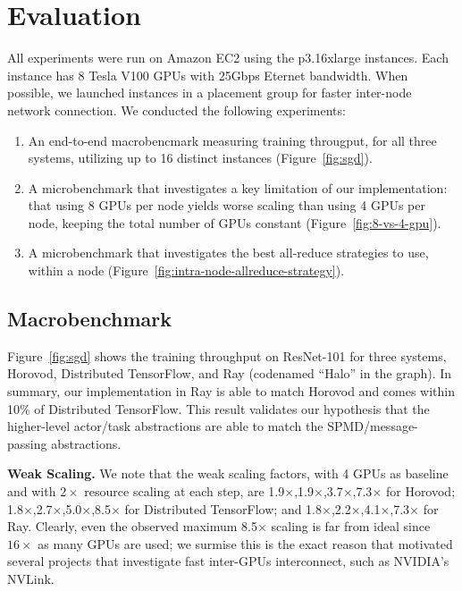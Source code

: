 
\section{Evaluation}
All experiments were run on Amazon EC2 using the p3.16xlarge instances.  Each instance has 8 Tesla V100 GPUs with 25Gbps Eternet bandwidth.  When possible, we launched instances in a placement group for faster inter-node network connection.  We conducted the following experiments:

\begin{enumerate}
    \item An end-to-end macrobencmark measuring training througput, for all three systems, utilizing up to 16 distinct instances (Figure~\ref{fig:sgd}).
    \item A microbenchmark that investigates a key limitation of our implementation: that using 8 GPUs per node yields worse scaling than using 4 GPUs per node, keeping the total number of GPUs constant (Figure~\ref{fig:8-vs-4-gpu}).
    \item A microbenchmark that investigates the best all-reduce strategies to use, within a node (Figure~\ref{fig:intra-node-allreduce-strategy}).
\end{enumerate}


\subsection{Macrobenchmark}
Figure~\ref{fig:sgd} shows the training throughput on ResNet-101 for three systems, Horovod, Distributed TensorFlow, and Ray (codenamed ``Halo'' in the graph).  In summary, our implementation in Ray is able to match Horovod and comes within 10\% of Distributed TensorFlow.  This result validates our hypothesis that the higher-level actor/task abstractions are able to match the SPMD/message-passing abstractions.

{\bf Weak Scaling.}  We note that the weak scaling factors, with 4 GPUs as baseline and with $2\times$ resource scaling at each step, are 1.9$\times$,1.9$\times$,3.7$\times$,7.3$\times$ for Horovod;
1.8$\times$,2.7$\times$,5.0$\times$,8.5$\times$ for Distributed TensorFlow;
and
1.8$\times$,2.2$\times$,4.1$\times$,7.3$\times$ for Ray.  Clearly, even the observed maximum 8.5$\times$ scaling  is far from ideal since $16\times$ as many GPUs are used; we surmise this is the exact reason that motivated several projects that investigate fast inter-GPUs interconnect, such as  NVIDIA's NVLink.


